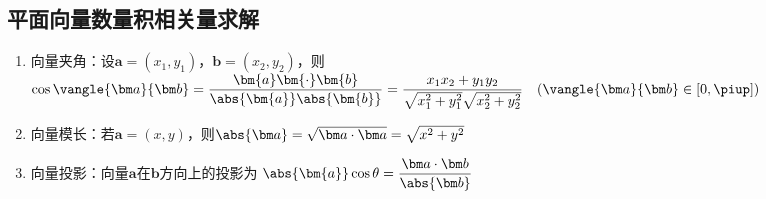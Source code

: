   \subsection{平面向量数量积相关量求解}
    \begin{enumerate}[label=\arabic*)]
      \item 向量夹角：设$\bm a=(x_1,y_1)$，$\bm b=(x_2,y_2)$，则
        $\cos\vangle{\bm a}{\bm b}=\dfrac{\bm{a}\bm{\cdot}\bm{b}}{\abs{\bm{a}}\abs{\bm{b}}}=\dfrac{x_1x_2+y_1y_2}{\sqrt{x_1^2+y_1^2}\sqrt{x_2^2+y_2^2}} \quad (\vangle{\bm a}{\bm b}\in\left[0,\piup\right])$
      \item 向量模长：若$\bm a=(x,y)$，则$\abs{\bm a}=\sqrt{\bm a\cdot\bm a}=\sqrt{x^2+y^2}$
      \item 向量投影：向量$\bm a$在$\bm b$方向上的投影为  $\abs{\bm{a}}\cos\theta=\dfrac{\bm a\cdot\bm b}{\abs{\bm b}}$
    \end{enumerate}
